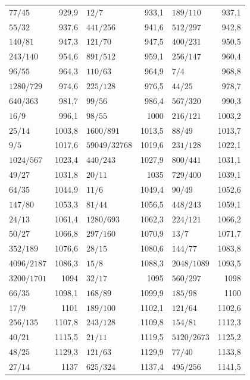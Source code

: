 {\begin{longtable}{l r @{\qquad} l r @{\qquad} l r}
$77/45$ & 929{,}9 & $12/7$ & 933{,}1 & $189/110$ & 937{,}1 \\
$55/32$ & 937{,}6 & $441/256$ & 941{,}6 & $512/297$ & 942{,}8 \\
$140/81$ & 947{,}3 & $121/70$ & 947{,}5 & $400/231$ & 950{,}5 \\
$243/140$ & 954{,}6 & $891/512$ & 959{,}1 & $256/147$ & 960{,}4 \\
$96/55$ & 964{,}3 & $110/63$ & 964{,}9 & $7/4$ & 968{,}8 \\
$1280/729$ & 974{,}6 & $225/128$ & 976{,}5 & $44/25$ & 978{,}7 \\
$640/363$ & 981{,}7 & $99/56$ & 986{,}4 & $567/320$ & 990{,}3 \\
$16/9$ & 996{,}1 & $98/55$ & 1000 & $216/121$ & 1003{,}2 \\
$25/14$ & 1003{,}8 & $1600/891$ & 1013{,}5 & $88/49$ & 1013{,}7 \\
$9/5$ & 1017{,}6 & $59049/32768$ & 1019{,}6 & $231/128$ & 1022{,}1 \\
$1024/567$ & 1023{,}4 & $440/243$ & 1027{,}9 & $800/441$ & 1031{,}1 \\
$49/27$ & 1031{,}8 & $20/11$ & 1035 & $729/400$ & 1039{,}1 \\
$64/35$ & 1044{,}9 & $11/6$ & 1049{,}4 & $90/49$ & 1052{,}6 \\
$147/80$ & 1053{,}3 & $81/44$ & 1056{,}5 & $448/243$ & 1059{,}1 \\
$24/13$ & 1061{,}4 & $1280/693$ & 1062{,}3 & $224/121$ & 1066{,}2 \\
$50/27$ & 1066{,}8 & $297/160$ & 1070{,}9 & $13/7$ & 1071{,}7 \\
$352/189$ & 1076{,}6 & $28/15$ & 1080{,}6 & $144/77$ & 1083{,}8 \\
$4096/2187$ & 1086{,}3 & $15/8$ & 1088{,}3 & $2048/1089$ & 1093{,}5 \\
$3200/1701$ & 1094 & $32/17$ & 1095 & $560/297$ & 1098 \\
$66/35$ & 1098{,}1 & $168/89$ & 1099{,}9 & $185/98$ & 1100 \\
$17/9$ & 1101 & $189/100$ & 1102{,}1 & $121/64$ & 1102{,}6 \\
$256/135$ & 1107{,}8 & $243/128$ & 1109{,}8 & $154/81$ & 1112{,}3 \\
$40/21$ & 1115{,}5 & $21/11$ & 1119{,}5 & $5120/2673$ & 1125{,}2 \\
$48/25$ & 1129{,}3 & $121/63$ & 1129{,}9 & $77/40$ & 1133{,}8 \\
$27/14$ & 1137 & $625/324$ & 1137{,}4 & $495/256$ & 1141{,}5 \\

\end{longtable}}
